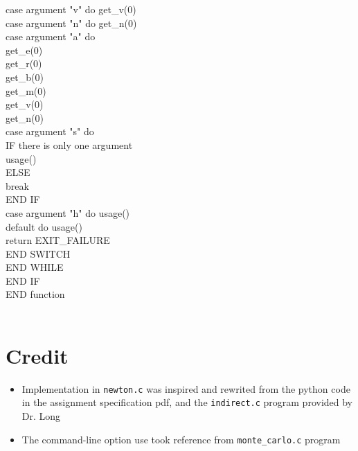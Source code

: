 \documentclass[12pt]{article}
\begin{document}
\indent \indent \indent \indent case argument "v" do get\_v(0) \\
\indent \indent \indent \indent case argument "n" do get\_n(0) \\
\indent \indent \indent \indent case argument "a" do \\
\indent \indent \indent \indent \indent get\_e(0) \\
\indent \indent \indent \indent \indent get\_r(0) \\
\indent \indent \indent \indent \indent get\_b(0) \\
\indent \indent \indent \indent \indent get\_m(0) \\
\indent \indent \indent \indent \indent get\_v(0) \\
\indent \indent \indent \indent \indent get\_n(0) \\
\indent \indent \indent \indent case argument "s" do \\
\indent \indent \indent \indent \indent IF there is only one argument \\
\indent \indent \indent \indent \indent \indent usage() \\
\indent \indent \indent \indent \indent ELSE \\
\indent \indent \indent \indent \indent \indent break \\
\indent \indent \indent \indent \indent END IF \\
\indent \indent \indent \indent case argument "h" do usage() \\
\indent \indent \indent \indent default do usage() \\
\indent \indent \indent \indent \indent return EXIT\_FAILURE \\
\indent \indent \indent END SWITCH \\
\indent \indent END WHILE \\
\indent END IF \\
END function \\
\\
\section{Credit}

\begin{itemize}
  \item Implementation in \texttt{newton.c} was inspired and rewrited from the python code in the assignment specification pdf, and the \texttt{indirect.c} program provided by Dr. Long
  \item The command-line option use took reference from \texttt{monte\_carlo.c} program
\end{itemize}
\end{document}
